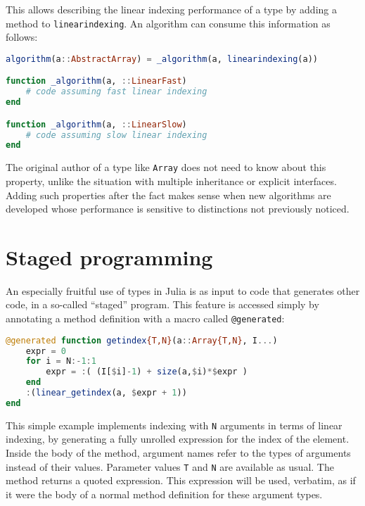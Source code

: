\noindent
This allows describing the linear indexing performance of a type by adding
a method to \texttt{linearindexing}.
An algorithm can consume this information as follows:

\begin{singlespace}
\begin{lstlisting}[language=julia]
algorithm(a::AbstractArray) = _algorithm(a, linearindexing(a))

function _algorithm(a, ::LinearFast)
    # code assuming fast linear indexing
end

function _algorithm(a, ::LinearSlow)
    # code assuming slow linear indexing
end
\end{lstlisting}
\end{singlespace}

\noindent
The original author of a type like \texttt{Array} does not need to know
about this property, unlike the situation with multiple inheritance or
explicit interfaces.
Adding such properties after the fact makes sense when new algorithms
are developed whose performance is sensitive to distinctions not
previously noticed.


\section{Staged programming}
\label{sec:stagedprogramming}

An especially fruitful use of types in Julia is as input to code that
generates other code, in a so-called ``staged'' program.
This feature is accessed simply by annotating a method definition
with a macro called \texttt{@generated}:

\begin{singlespace}
\begin{lstlisting}[language=julia]
@generated function getindex{T,N}(a::Array{T,N}, I...)
    expr = 0
    for i = N:-1:1
        expr = :( (I[$i]-1) + size(a,$i)*$expr )
    end
    :(linear_getindex(a, $expr + 1))
end
\end{lstlisting}
\end{singlespace}



\noindent
This simple example implements indexing with \texttt{N} arguments
in terms of linear indexing, by generating a fully unrolled expression
for the index of the element.
Inside the body of the method, argument names refer to the types of
arguments instead of their values.
Parameter values \texttt{T} and \texttt{N} are available as usual.
The method returns a quoted expression.
This expression will be used, verbatim, as if it were the body of
a normal method definition for these argument types.

